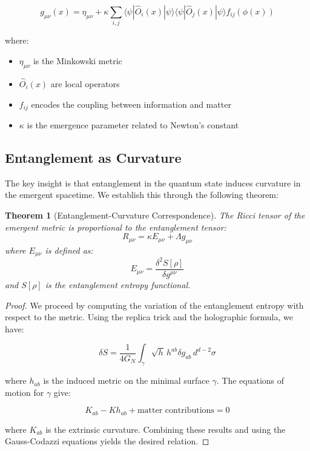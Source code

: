 \documentclass[12pt,a4paper]{article}
\newtheorem{theorem}{Theorem}[section]
\begin{document}
\begin{equation}
g_{\mu\nu}(x) = \eta_{\mu\nu} + \kappa \sum_{i,j} \langle\psi|\hat{O}_i(x)|\psi\rangle \langle\psi|\hat{O}_j(x)|\psi\rangle f_{ij}(\phi(x))
\end{equation}

where:
\begin{itemize}
\item $\eta_{\mu\nu}$ is the Minkowski metric
\item $\hat{O}_i(x)$ are local operators
\item $f_{ij}$ encodes the coupling between information and matter
\item $\kappa$ is the emergence parameter related to Newton's constant
\end{itemize}

\subsection{Entanglement as Curvature}

The key insight is that entanglement in the quantum state induces curvature in the emergent spacetime. We establish this through the following theorem:

\begin{theorem}[Entanglement-Curvature Correspondence]
The Ricci tensor of the emergent metric is proportional to the entanglement tensor:
\begin{equation}
R_{\mu\nu} = \kappa E_{\mu\nu} + \Lambda g_{\mu\nu}
\end{equation}
where $E_{\mu\nu}$ is defined as:
\begin{equation}
E_{\mu\nu} = \frac{\delta^2 S[\rho]}{\delta g^{\mu\nu}}
\end{equation}
and $S[\rho]$ is the entanglement entropy functional.
\end{theorem}

\begin{proof}
We proceed by computing the variation of the entanglement entropy with respect to the metric. Using the replica trick and the holographic formula, we have:

\begin{equation}
\delta S = \frac{1}{4G_N} \int_{\gamma} \sqrt{h} \, h^{ab} \delta g_{ab} \, d^{d-2}\sigma
\end{equation}

where $h_{ab}$ is the induced metric on the minimal surface $\gamma$. The equations of motion for $\gamma$ give:

\begin{equation}
K_{ab} - K h_{ab} + \text{matter contributions} = 0
\end{equation}

where $K_{ab}$ is the extrinsic curvature. Combining these results and using the Gauss-Codazzi equations yields the desired relation.
\end{proof}
\end{document}
